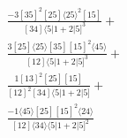 \documentclass[varwidth, border=5pt]{standalone}
\begin{document}
\begin{my}
$\begin{gathered}
\scriptscriptstyle\frac{-3[35]^2[25]⟨25⟩^2[15]}{[34]⟨5|1+2|5]^3}+\\
\scriptscriptstyle\frac{3[25]⟨25⟩[35][15]^2⟨45⟩}{[12]⟨5|1+2|5]^3}+\\
\scriptscriptstyle\frac{1[13]^2[25][15]}{[12]^2[34]⟨5|1+2|5]}+\\
\scriptscriptstyle\frac{-1⟨45⟩[25][15]^2⟨24⟩}{[12]⟨34⟩⟨5|1+2|5]^2}\phantom{+}
\end{gathered}$
\end{my}
\end{document}
